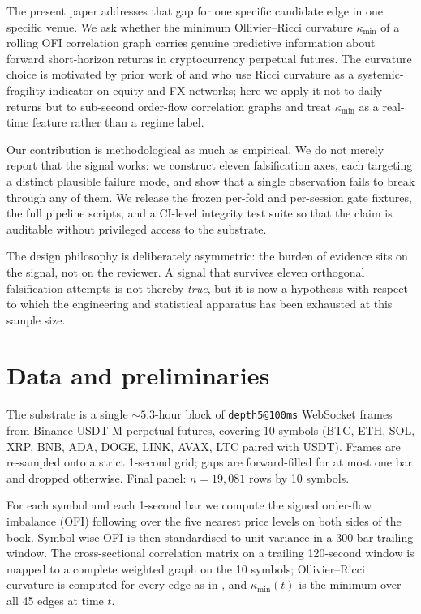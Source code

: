 \documentclass[11pt,a4paper]{article}
\begin{document}
The present paper addresses that gap for one specific candidate edge in one
specific venue. We ask whether the minimum Ollivier--Ricci curvature
$\kappa_{\min}$ of a rolling OFI correlation graph carries genuine
predictive information about forward short-horizon returns in cryptocurrency
perpetual futures. The curvature choice is motivated by prior work of
\citet{sandhu2016marketfragility} and \citet{bai2020networkricci} who use
Ricci curvature as a systemic-fragility indicator on equity and FX networks;
here we apply it not to daily returns but to sub-second order-flow
correlation graphs and treat $\kappa_{\min}$ as a real-time feature rather
than a regime label.

Our contribution is methodological as much as empirical. We do not merely
report that the signal works: we construct eleven falsification axes,
each targeting a distinct plausible failure mode, and show that a single
observation fails to break through any of them. We release the frozen
per-fold and per-session gate fixtures, the full pipeline scripts, and a
CI-level integrity test suite so that the claim is auditable without
privileged access to the substrate.

The design philosophy is deliberately asymmetric: the burden of evidence
sits on the signal, not on the reviewer. A signal that survives eleven
orthogonal falsification attempts is not thereby \emph{true}, but it is now
a hypothesis with respect to which the engineering and statistical
apparatus has been exhausted at this sample size.

\section{Data and preliminaries}
\label{sec:data}

The substrate is a single $\sim\!5.3$-hour block of
\texttt{depth5@100ms} WebSocket frames from Binance USDT-M perpetual
futures, covering 10 symbols (BTC, ETH, SOL, XRP, BNB, ADA, DOGE, LINK,
AVAX, LTC paired with USDT). Frames are re-sampled onto a strict 1-second
grid; gaps are forward-filled for at most one bar and dropped otherwise.
Final panel: $n = 19{,}081$ rows by 10 symbols.

For each symbol and each 1-second bar we compute the signed order-flow
imbalance (OFI) following \citet{cont2014ofi} over the five nearest price
levels on both sides of the book. Symbol-wise OFI is then standardised to
unit variance in a 300-bar trailing window. The cross-sectional
correlation matrix on a trailing 120-second window is mapped to a complete
weighted graph on the 10 symbols; Ollivier--Ricci curvature is computed
for every edge as in \citet{ollivier2009ricci}, and $\kappa_{\min}(t)$ is
the minimum over all 45 edges at time $t$.
\end{document}
